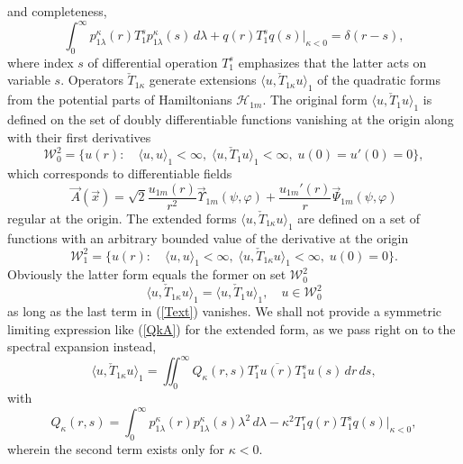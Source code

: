 \documentclass[12pt]{article}
\newcommand{\ol}{\overline}
\newcommand{\HH}{\mathscr{H}}
\newcommand{\WW}{\mathscr{W}}
\begin{document}
	and completeness,
\begin{equation*}
    \int_{0}^{\infty} p_{1\lambda}^{\kappa}(r)
	T_{1}^{s} p_{1\lambda}^{\kappa}(s) \,d\lambda
        + q(r) T_{1}^{s} q(s)\bigr|_{\kappa < 0} = \delta(r-s) ,
\end{equation*}
	where index
$ s $
	of differential operation
$ T_{1}^{s} $
	emphasizes that the latter acts on variable
$ s $.
	Operators
$ \check{T}_{1\kappa} $
	generate extensions
$ \langle u, \check{T}_{1\kappa} u\rangle_{1} $
	of the quadratic forms from the potential parts of Hamiltonians
$ \HH_{1m} $.
	The original form
$ \langle u, \check{T}_{1} u\rangle_{1} $
	is defined on the set of doubly differentiable functions
	vanishing at the origin along with their first derivatives
\begin{equation*}
    \WW^{2}_{0} = \{u(r):\quad \langle u,u\rangle_{1} <\infty, \;
	\langle u, \check{T}_{1} u\rangle_{1} < \infty, \; u(0)=u'(0) =0 \} ,
\end{equation*}
	which corresponds to differentiable fields
\begin{equation}
\label{Atrns}
    \vec{A}(\vec{x}) =
        \sqrt{2}
	    \frac{u_{1m}(r)}{r^{2}} \vec{\Upsilon}_{1m}(\psi,\varphi) +
        \frac{u_{1m}'(r)}{r} \vec{\Psi}_{1m}(\psi,\varphi)
\end{equation}
	regular at the origin.
	The extended forms
$ \langle u, \check{T}_{1\kappa} u\rangle_{1} $
	are defined on a set of functions with an arbitrary bounded value
	of the derivative at the origin
\begin{equation*}
    \WW^{2}_{1} = \{u(r):\quad \langle u,u\rangle_{1} <\infty, \;
	\langle u, \check{T}_{1\kappa}u\rangle_{1} < \infty, \; u(0)=0 \} .
\end{equation*}
	Obviously the latter form equals the former on set
$ \WW^{2}_{0} $
\begin{equation*}
    \langle u, \check{T}_{1\kappa} u\rangle_{1}= \langle u,
	\check{T}_{1} u\rangle_{1} ,\quad u \in \WW^{2}_{0} 
\end{equation*}
    as long as the last term in
(\ref{Text})
    vanishes.
	We shall not provide a symmetric limiting expression like
(\ref{QkA})
    for the extended
	form, as we pass right on to the spectral expansion instead,
\begin{equation*}
    \langle u, \check{T}_{1\kappa} u\rangle_{1}
    = \iint_{0}^{\infty} Q_{\kappa}(r,s) T_{1}^{r} \ol{u(r)}
	T_{1}^{s} u(s) \,dr\,ds ,
\end{equation*}
	with
\begin{equation*}
    Q_{\kappa}(r,s) = \int_{0}^{\infty} p_{1\lambda}^{\kappa}(r)
    	p_{1\lambda}^{\kappa}(s) \lambda^{2} \,d\lambda
        - \kappa^{2} T_{1}^{r} q(r) T_{1}^{s} q(s) \bigr|_{\kappa <0} ,
\end{equation*}
	wherein the second term exists only for
$ \kappa < 0 $.
\end{document}
